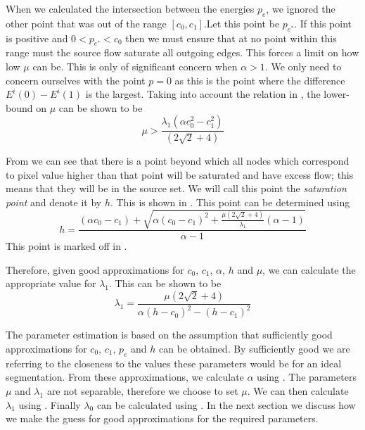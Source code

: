 \documentclass[10pt, journal, letterpaper, onecolumn, draftcls]{IEEEtran}
\begin{document}
When we calculated the intersection between the energies $p_e$, we ignored the other point that was out of the range $[c_0, c_1]$.Let this point be $p_{e^*}$. If this point is positive and $0<p_{e^*}<c_0$ then we must ensure that at no point within this range must the source flow saturate all outgoing edges. This forces a limit on how low $\mu$ can be. This is only of significant concern when $\alpha>1$. We only need to concern ourselves with the point $p=0$ as this is the point where the difference $E^i(0)-E^i(1)$ is the largest. Taking into account the relation in , the lower-bound on $\mu$ can be shown to be 
\begin{equation}
	\mu > \frac{\lambda_1(\alpha c_0^2-c_1^2)}{\left( 2\sqrt{2} + 4\right)}
	\label{eq:mulowerbound}
\end{equation}

From  we can see that there is a point beyond which all nodes which correspond to pixel value higher than that point will be saturated and have excess flow; this means that they will be in the source set. We will call this point the \textit{saturation point} and denote it by $h$. This is shown in . This point can be determined using
\begin{equation}
	h = \frac{(\alpha c_0-c_1)+\sqrt{\alpha(c_0-c_1)^2+\frac{\mu(2\sqrt{2}+4)}{\lambda_1}(\alpha-1)}}{\alpha-1}
	\label{eq:h}
\end{equation}
This point is marked off in .

Therefore, given good approximations for $c_0$, $c_1$, $\alpha$, $h$ and $\mu$, we can calculate the appropriate value for $\lambda_1$. This can be shown to be
\begin{equation}
	\lambda_1 = \frac{\mu(2\sqrt{2}+4)}{\alpha(h-c_0)^2-(h-c_1)^2}
	\label{eq:lambda1approximation}
\end{equation}

The parameter estimation is based on the assumption that sufficiently good approximations for $c_0$, $c_1$, $p_e$ and $h$ can be obtained. By sufficiently good we are referring to the closeness to the values these parameters would be for an ideal segmentation. From these approximations, we calculate $\alpha$ using . The parameters $\mu$ and $\lambda_1$ are not separable, therefore we choose to set $\mu$. We can then calculate $\lambda_1$ using . Finally $\lambda_0$ can be calculated using . In the next section we discuss how we make the guess for good approximations for the required parameters.
\end{document}
